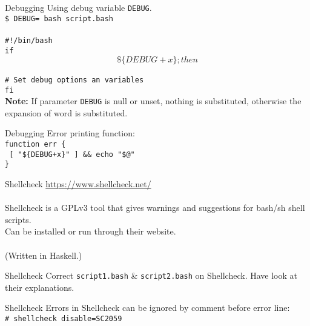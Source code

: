 \documentclass{beamer}
\let\tt\texttt
\let\bf\textbf
\begin{document}
\begin{frame}{Debugging}
    Using debug variable \tt{DEBUG}.    \\
    \tt{\$ DEBUG= bash script.bash}      \\
    \quad   \\
    \tt{\#!/bin/bash}                   \\
    \tt{if \[ \$\{DEBUG+x\}; then \] }              \\
    \quad \tt{\# Set debug options an variables}    \\
    \tt{fi}                                         \\
    \bf{Note:} If parameter \tt{DEBUG} is null or unset, nothing is substituted, otherwise the expansion of word is substituted.   \\
\end{frame}

\begin{frame}{Debugging}
    Error printing function:                       \\
    \tt{function err \{ }                          \\
    \quad \tt{ [ "\$\{DEBUG+x\}" ] \&\& echo "\$@"}  \\
    \tt{\}}
\end{frame}

\begin{frame}{Shellcheck}
    \url{https://www.shellcheck.net/}               \\
    \quad       \\
    Shellcheck is a GPLv3 tool that gives warnings and suggestions for bash/sh shell scripts.   \\
    Can be installed or run through their website.      \\
    \quad   \\
    (Written in Haskell.)
\end{frame}

\begin{frame}{Shellcheck}
    Correct \tt{script1.bash} \& \tt{script2.bash} on Shellcheck. Have look at their explanations.
\end{frame}

\begin{frame}{Shellcheck}
    Errors in Shellcheck can be ignored by comment before error line:    \\
    \tt{\# shellcheck disable=SC2059}
\end{frame}
\end{document}
